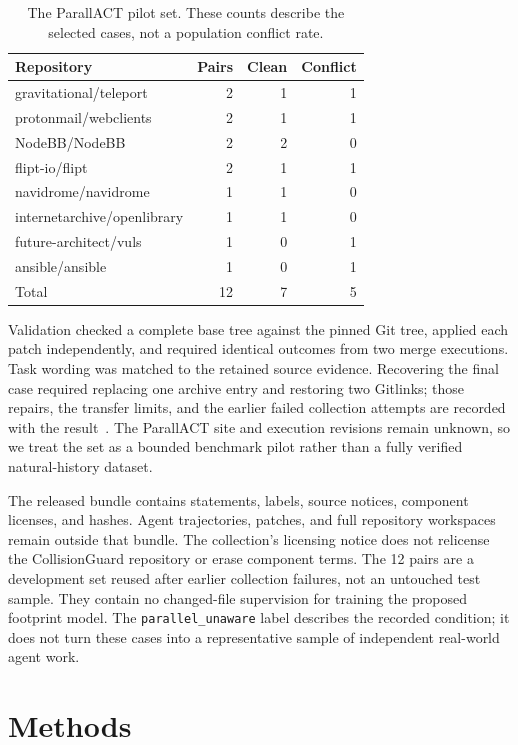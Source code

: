 \documentclass[sigconf,authorversion,nonacm]{acmart}
\begin{document}
\begin{table}[t]
\caption{The ParallACT pilot set. These counts describe the selected cases, not a population conflict rate.}
\label{tab:repos}
\centering
\begin{tabular}{lrrr}
\toprule
Repository & Pairs & Clean & Conflict\\
\midrule
gravitational/teleport & 2 & 1 & 1\\
protonmail/webclients & 2 & 1 & 1\\
NodeBB/NodeBB & 2 & 2 & 0\\
flipt-io/flipt & 2 & 1 & 1\\
navidrome/navidrome & 1 & 1 & 0\\
internetarchive/openlibrary & 1 & 1 & 0\\
future-architect/vuls & 1 & 0 & 1\\
ansible/ansible & 1 & 0 & 1\\
\midrule
Total & 12 & 7 & 5\\
\bottomrule
\end{tabular}
\end{table}

Validation checked a complete base tree against the pinned Git tree, applied each patch independently, and required identical outcomes from two merge executions. Task wording was matched to the retained source evidence. Recovering the final case required replacing one archive entry and restoring two Gitlinks; those repairs, the transfer limits, and the earlier failed collection attempts are recorded with the result~\cite{recoveryresults}. The ParallACT site and execution revisions remain unknown, so we treat the set as a bounded benchmark pilot rather than a fully verified natural-history dataset.

The released bundle contains statements, labels, source notices, component licenses, and hashes. Agent trajectories, patches, and full repository workspaces remain outside that bundle. The collection's licensing notice does not relicense the CollisionGuard repository or erase component terms. The 12 pairs are a development set reused after earlier collection failures, not an untouched test sample. They contain no changed-file supervision for training the proposed footprint model. The \texttt{parallel\_unaware} label describes the recorded condition; it does not turn these cases into a representative sample of independent real-world agent work.

\section{Methods}
\end{document}
